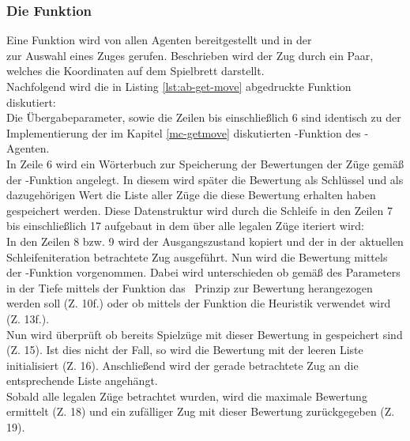\subsubsection{Die Funktion }
Eine Funktion  wird von allen Agenten bereitgestellt und in der \\ zur Auswahl eines Zuges gerufen. Beschrieben wird der Zug durch ein Paar, welches die Koordinaten auf dem Spielbrett darstellt.
\\Nachfolgend wird die in Listing \ref{lst:ab-get-move} abgedruckte Funktion diskutiert:
\\Die Übergabeparameter, sowie die Zeilen bis einschließlich 6 sind identisch zu der Implementierung der im Kapitel \ref{mc-getmove} diskutierten -Funktion des \mxZitat{\mc}-Agenten.
\\In Zeile 6 wird ein Wörterbuch zur Speicherung der Bewertungen der Züge gemäß der -Funktion angelegt. In diesem wird später die Bewertung als Schlüssel und als dazugehörigen Wert die Liste aller Züge die diese Bewertung erhalten haben gespeichert werden. Diese Datenstruktur wird durch die Schleife in den Zeilen 7 bis einschließlich 17 aufgebaut in dem über alle legalen Züge iteriert wird:
\\In den Zeilen 8 bzw. 9 wird der Ausgangszustand kopiert und der in der aktuellen Schleifeniteration betrachtete Zug  ausgeführt. Nun wird die Bewertung mittels der -Funktion vorgenommen. Dabei wird unterschieden ob gemäß des Parameters  in der Tiefe  mittels der Funktion  das \mc\ Prinzip zur Bewertung herangezogen werden soll (Z. 10f.) oder ob mittels der Funktion  die Heuristik verwendet wird (Z. 13f.).
\\Nun wird überprüft ob bereits Spielzüge mit dieser Bewertung in  gespeichert sind (Z. 15). Ist dies nicht der Fall, so wird die Bewertung mit der leeren Liste initialisiert (Z. 16). Anschließend wird der gerade betrachtete Zug  an die entsprechende Liste angehängt.
\\Sobald alle legalen Züge betrachtet wurden, wird die maximale Bewertung ermittelt (Z. 18) und ein zufälliger Zug mit dieser Bewertung zurückgegeben (Z. 19).
\newpage

